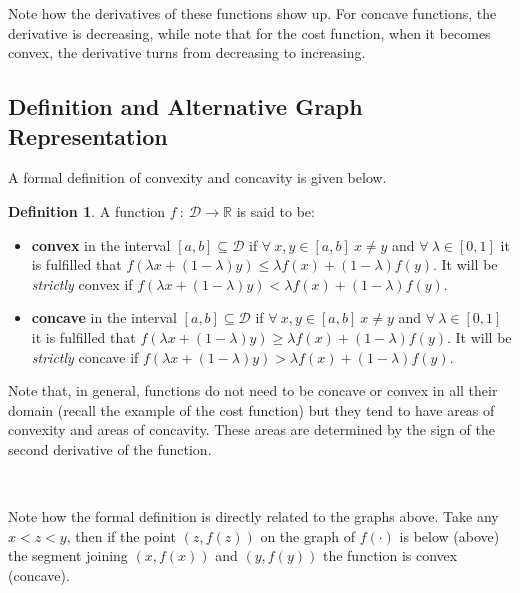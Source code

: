 \documentclass[11pt]{article}
\theoremstyle{definition}
\newtheorem{definition}{Definition}
\theoremstyle{plain}
\begin{document}
Note how the derivatives of these functions show up. For concave
functions, the derivative is decreasing, while note that for the cost
function, when it becomes convex, the derivative turns from decreasing
to increasing.

\subsection{Definition and Alternative Graph
Representation}\label{definition-and-alternative-graph-representation}

A formal definition of convexity and concavity is given below.

\begin{definition}
A function \(f \: : \: \mathcal{D} \rightarrow \mathbb{R}\) is said to be: 

\begin{itemize}
    \item \textbf{convex} in the interval \([a,b]\subseteq\mathcal{D}\) if \(\forall \: x,y\in[a,b] \: x\neq y\) and \(\forall \: \lambda\in[0, 1]\) it is fulfilled that \(f\left(\lambda x + (1-\lambda)y\right) \leq \lambda f(x) + (1-\lambda) f(y)\). It will be \emph{strictly} convex if \(f\left(\lambda x + (1-\lambda)y\right) < \lambda f(x) + (1-\lambda) f(y)\).

    \item \textbf{concave} in the interval \([a,b]\subseteq\mathcal{D}\) if \(\forall \: x,y\in[a,b] \: x\neq y\) and \(\forall \: \lambda\in[0,1]\) it is fulfilled that \(f(\lambda x + (1-\lambda) y)\geq \lambda f(x) + (1-\lambda) f(y)\). It will be \emph{strictly} concave if \(f\left(\lambda x + (1-\lambda)y\right) > \lambda f(x) + (1-\lambda) f(y)\).
\end{itemize}
\end{definition}

Note that, in general, functions do not need to be concave or convex in
all their domain (recall the example of the cost function) but they tend
to have areas of convexity and areas of concavity. These areas are
determined by the sign of the second derivative of the function.

    \begin{center}
    \end{center}
    { \hspace*{\fill} \\}
    
    Note how the formal definition is directly related to the graphs above.
Take any \(x < z < y\), then if the point \(\left(z, f(z)\right)\) on
the graph of \(f(\cdot)\) is below (above) the segment joining
\(\left(x, f(x)\right)\) and \(\left(y, f(y)\right)\) the function is
convex (concave).
\end{document}
